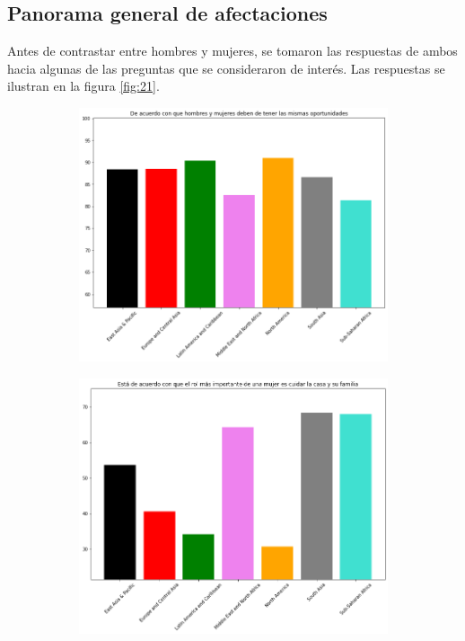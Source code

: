 \documentclass[12pt]{article}
\begin{document}
\subsection{Panorama general de afectaciones}
Antes de contrastar entre hombres y mujeres, se tomaron las respuestas de ambos hacia algunas de las preguntas que se consideraron de interés. Las respuestas se ilustran en la figura \ref{fig:21}.
\begin{figure}
     \centering
     \begin{subfigure}[b]{0.45\textwidth}
         \centering
         \includegraphics[width=\textwidth]{images/211.png}
         \caption{}
         \label{fig:211}
     \end{subfigure}
     \hfill
     \begin{subfigure}[b]{0.45\textwidth}
         \centering
         \includegraphics[width=\textwidth]{images/212.png}

\end{subfigure}
\end{figure}
\end{document}
